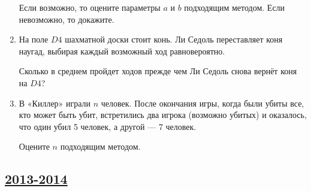 \begin{enumerate}
Если возможно, то оцените параметры $a$ и $b$ подходящим методом. Если невозможно,
то докажите.

\item На поле $D4$ шахматной доски стоит конь. Ли Седоль переставляет коня наугад,
выбирая каждый возможный ход равновероятно.

Сколько в среднем пройдет ходов прежде чем Ли Седоль снова вернёт коня на $D4$?

\item В «Киллер» играли $n$ человек. После окончания игры, когда были убиты все,
кто может быть убит, встретились два игрока (возможно убитых) и оказалось, что
один убил 5 человек, а другой — 7 человек.

Оцените $n$ подходящим методом.
\end{enumerate}


\newpage
\subsection[2013-2014]{\hyperref[sec:sol_kr_03_ip_2013_2014]{2013-2014}}
\label{sec:kr_03_ip_2013_2014}


